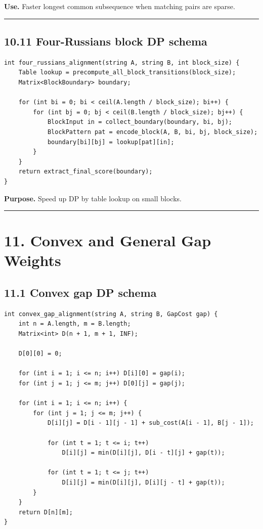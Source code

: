 \documentclass[11pt]{article}
\begin{document}
\textbf{Use.} Faster longest common subsequence when matching pairs are sparse.

\begin{center}\rule{0.5\linewidth}{0.5pt}\end{center}

\subsection{10.11 Four-Russians block DP schema}\label{four-russians-block-dp-schema}

\begin{verbatim}
int four_russians_alignment(string A, string B, int block_size) {
    Table lookup = precompute_all_block_transitions(block_size);
    Matrix<BlockBoundary> boundary;

    for (int bi = 0; bi < ceil(A.length / block_size); bi++) {
        for (int bj = 0; bj < ceil(B.length / block_size); bj++) {
            BlockInput in = collect_boundary(boundary, bi, bj);
            BlockPattern pat = encode_block(A, B, bi, bj, block_size);
            boundary[bi][bj] = lookup[pat][in];
        }
    }
    return extract_final_score(boundary);
}
\end{verbatim}

\textbf{Purpose.} Speed up DP by table lookup on small blocks.

\begin{center}\rule{0.5\linewidth}{0.5pt}\end{center}

\section{11. Convex and General Gap Weights}\label{convex-and-general-gap-weights}

\subsection{11.1 Convex gap DP schema}\label{convex-gap-dp-schema}

\begin{verbatim}
int convex_gap_alignment(string A, string B, GapCost gap) {
    int n = A.length, m = B.length;
    Matrix<int> D(n + 1, m + 1, INF);

    D[0][0] = 0;

    for (int i = 1; i <= n; i++) D[i][0] = gap(i);
    for (int j = 1; j <= m; j++) D[0][j] = gap(j);

    for (int i = 1; i <= n; i++) {
        for (int j = 1; j <= m; j++) {
            D[i][j] = D[i - 1][j - 1] + sub_cost(A[i - 1], B[j - 1]);

            for (int t = 1; t <= i; t++)
                D[i][j] = min(D[i][j], D[i - t][j] + gap(t));

            for (int t = 1; t <= j; t++)
                D[i][j] = min(D[i][j], D[i][j - t] + gap(t));
        }
    }
    return D[n][m];
}
\end{verbatim}
\end{document}
